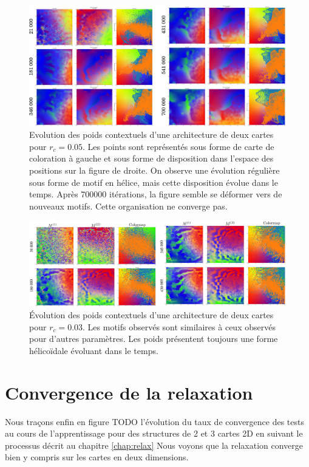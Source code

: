 \documentclass[../main]{subfiles}
\begin{document}
\begin{figure}
	\includegraphics[width=\textwidth]{sphere_rc005_evol_landscape}
	\caption{Evolution des poids contextuels d'une architecture de deux cartes pour $r_c =0.05$. Les points sont représentés sous forme de carte de coloration à gauche et sous forme de disposition dans l'espace des positions sur la figure de droite. On observe une évolution régulière sous forme de motif en hélice, mais cette disposition évolue dans le temps. Après 700000 itérations, la figure semble se déformer vers de nouveaux motifs. Cette organisation ne converge pas.}
\end{figure}


\begin{figure}
	\includegraphics[width=\textwidth]{wc_rc003_evol.pdf}
	\caption{\'Evolution des poids contextuels d'une architecture de deux cartes pour $r_c =0.03$. Les motifs observés sont similaires à ceux observés pour d'autres paramètres. Les poids présentent toujours une forme hélicoïdale évoluant dans le temps.}
\end{figure}



\section{Convergence de la relaxation}

Nous traçons enfin en figure TODO l'évolution du taux de convergence des tests au cours de l'apprentissage pour des structures de 2 et 3 cartes 2D en suivant le processus décrit au chapitre \ref{chap:relax}
Nous voyons que la relaxation converge bien y compris sur les cartes en deux dimensions.
\end{document}
